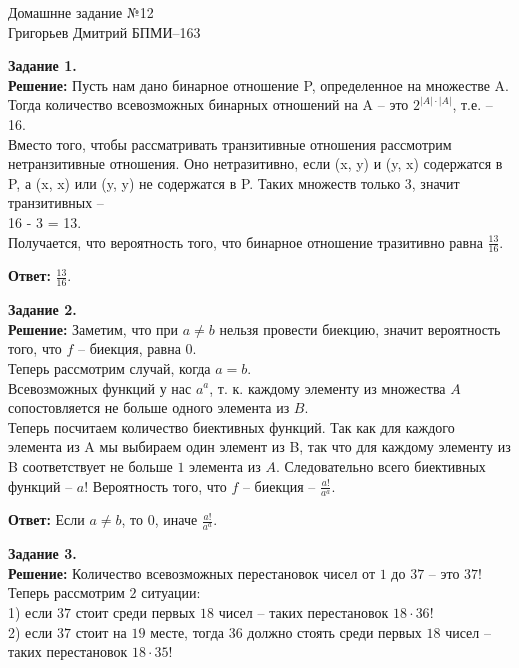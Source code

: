 \documentclass[12pt,a4paper]{scrartcl}
\begin{document}
	\begin{center}	
		Домашнне задание №12 \\
		Григорьев Дмитрий БПМИ--163
	\end{center}
	\textbf{Задание 1.} \\
	\textbf{Решение:}
	Пусть нам дано бинарное отношение P, определенное на множестве A. Тогда количество всевозможных бинарных отношений на A -- это $2^{|A|\cdot|A|}$, т.е. -- 16. \\
	Вместо того, чтобы рассматривать транзитивные отношения рассмотрим нетранзитивные отношения. Оно нетразитивно, если (x, y) и (y, x) содержатся в P, а (x, x) или (y, y) не содержатся в P. Таких множеств только 3, значит транзитивных -- \\ 16 - 3 = 13.
	\\
	Получается, что вероятность того, что бинарное отношение тразитивно равна $\frac{13}{16}$.
	\begin{flushright}	
		\textbf{Ответ:} { $\frac{13}{16}$}.
	\end{flushright} 
	\textbf{Задание 2.}\\
	\textbf{Решение:}
	Заметим, что при $a \neq b$ нельзя провести биекцию, значит вероятность того, что $f$ -- биекция, равна $0$. \\
	Теперь рассмотрим случай, когда $a = b$. \\
	Всевозможных функций у нас $a^a$, т. к. каждому элементу из множества $A$ сопостовляется не больше одного элемента из $B$. \\
	Теперь посчитаем количество биективных функций. Так как для каждого элемента из A мы выбираем один элемент из B, так что для каждому элементу из B соответствует не больше $1$ элемента из $A$. Следовательно всего биективных функций -- $a!$ Вероятность того, что $f$ -- биекция -- $\frac{a!}{a^a}$.\\
	\begin{flushright}
		\textbf{Ответ:} Если $a \neq b$, то $0$, иначе $\frac{a!}{a^a}$.
	\end{flushright}
	\textbf{Задание 3.} 
	\\
	\textbf{Решение:}
	Количество всевозможных перестановок чисел от $1$ до $37$ -- это $37!$ 
	\\
	Теперь рассмотрим $2$ ситуации: \\
	1) если $37$ стоит среди первых $18$ чисел -- таких перестановок $18 \cdot 36!$ 	
	\\
	2) если $37$ стоит на $19$ месте, тогда $36$ должно стоять среди первых $18$ чисел -- таких перестановок $18 \cdot 35!$ 
\end{document}
